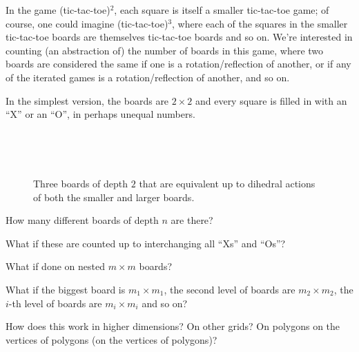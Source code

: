 \documentclass{article}
\begin{document}
In the game (tic-tac-toe)$^2$, each square is itself a smaller tic-tac-toe game;
of course, one could imagine (tic-tac-toe)$^3$, where each of the squares in
the smaller tic-tac-toe boards are themselves tic-tac-toe boards and so on.
We're interested in counting (an abstraction of) the number of boards in this game,
where two boards are considered the same if one is a rotation/reflection of
another, or if any of the iterated games is a rotation/reflection of another,
and so on.

In the simplest version, the boards are $2 \times 2$ and every square is
filled in with an ``X'' or an ``O'', in perhaps unequal numbers.

\begin{figure}[ht!]
  \centering
  ~
  ~
  \caption{
    Three boards of depth $2$ that are equivalent up to dihedral
    actions of both the smaller and larger boards.
  }
\end{figure}

\begin{question}
  How many different boards of depth $n$ are there?
\end{question}

\begin{related}
  \item What if these are counted up to interchanging all ``Xs'' and ``Os''?
  \item What if done on nested $m \times m$ boards?
  \item What if the biggest board is $m_1 \times m_1$, the second level of
    boards are $m_2 \times m_2$, the $i$-th level of boards are
    $m_i \times m_i$ and so on?
  \item How does this work in higher dimensions? On other grids?
  On polygons on the vertices of polygons (on the vertices of polygons)?
\end{related}
\end{document}
